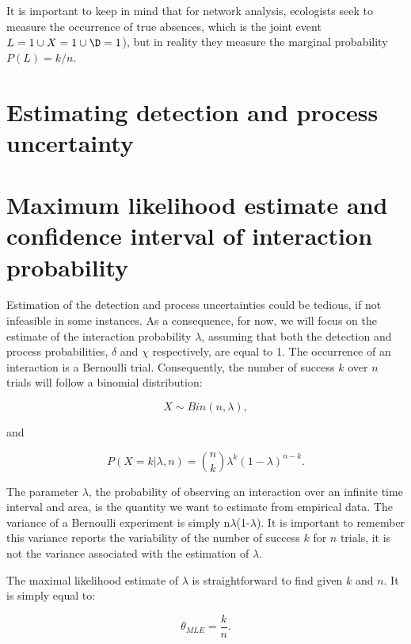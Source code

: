 \documentclass[12pt]{article}
\begin{document}
It is important to keep in mind that for network analysis, ecologists seek to measure the occurrence of true absences, which is the joint event $L=1\cup X=1 \cup \D=1$), but in reality they measure the marginal probability $P(L) = k/n$. 



\section*{Estimating detection and process uncertainty}




\section*{Maximum likelihood estimate and confidence interval of interaction probability}

Estimation of the detection and process uncertainties could be tedious, if not infeasible in some instances. As a consequence, for now, we will focus on the estimate of the interaction probability $\lambda$, assuming that both the detection and process probabilities, $\delta$ and $\chi$ respectively, are equal to 1. The occurrence of an interaction is a Bernoulli trial. Consequently, the number of success $k$ over $n$ trials will follow a binomial distribution: 
    
    \begin{equation}
      X \sim Bin(n,\lambda) ,
    \end{equation}

    \noindent and 

    \begin{equation}
       P(X = k|\lambda,n) = {n \choose k}\lambda^k(1-\lambda)^{n-k} . 
       \label{likelihood}
    \end{equation}

\noindent The parameter $\lambda$, the probability of observing an interaction over an infinite time interval and area, is the quantity we want to estimate from empirical data. The variance of a Bernoulli experiment is simply n$\lambda$(1-$\lambda$). It is important to remember this variance reports the variability of the number of success $k$ for $n$ trials, it is not the variance associated with the estimation of $\lambda$.

The maximal likelihood estimate of $\lambda$ is straightforward to find given $k$ and $n$. It is simply equal to:

    \begin{equation}
      \theta_{MLE} = \frac{k}{n}  .
      \label{theta_MLE}
    \end{equation}
\end{document}
